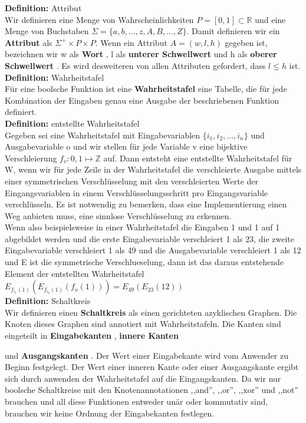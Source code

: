\documentclass{article}
\newenvironment{definition}
    [1]
    {
        {\bf Definition:} #1\\
    }
    {}
\newcommand{\defined}
    [1]
    {
        {\bf #1}
    }
\begin{document}
\begin{definition}{Attribut}
Wir definieren eine Menge von Wahrscheinlichkeiten 
\(P = [0, 1] \subset \mathbb{R}\) und eine Menge von Buchstaben 
\(\Sigma = \{a, b, \dots, z, A, B, \dots, Z\}\).
Damit definieren wir ein \defined{Attribut} als 
\(\Sigma^+ \times P \times P\). Wenn ein Attribut \(A = (w, l, h)\) gegeben ist,
bezeichnen wir w als \defined{Wort}, l als \defined{unterer Schwellwert} und h
als \defined{oberer Schwellwert}. Es wird desweiteren von allen Attributen
gefordert, dass \(l \leq h\) ist.
\end{definition}\\
\begin{definition}{Wahrheitstafel}
F\"ur eine boolsche Funktion ist eine \defined{Wahrheitstafel} eine Tabelle,
die f\"ur jede Kombination der Eingaben genau eine Ausgabe der beschriebenen
Funktion definiert.
\end{definition}\\
\begin{definition}{entstellte Wahrheitstafel}
Gegeben sei eine Wahrheitstafel mit Eingabevariablen 
\(\{i_1, i_2, \dots, i_n\}\) und Ausgabevariable o und wir 
 stellen f\"ur jede Variable v eine bijektive
 Verschleierung \(f_v : {0, 1} \mapsto \mathbb{Z}\) auf. 
Dann entsteht eine entstellte Wahrheitstafel f\"ur W, wenn
 wir f\"ur jede Zeile in der Wahrheitstafel die verschleierte Ausgabe
 mittels einer symmetrischen Verschl\"usselung mit den 
 verschleierten Werte der Eingangsvariablen in einem 
 Verschl\"usselungsschritt pro Eingangsvariable verschl\"usseln.
Es ist notwendig zu bemerken, dass eine Implementierung
 einen Weg anbieten muss, eine sinnlose Verschl\"usselung
 zu erkennen.\\
Wenn also beispielsweise in einer Wahrheitstafel die Eingaben 
 1 und 1 auf 1 abgebildet werden und die erste Eingabevariable
 verschleiert 1 als 23, die zweite Eingabevariable verschleiert
 1 als 49 und die Ausgabevariable verschleiert 1 als 12 und E
 ist die symmetrische Verschlueselung, dann
 ist das daraus entstehende Element der entstellten Wahrheitstafel
 \(E_{f_{i_1}(1)}(E_{f_{i_2}(1)}(f_o(1))) = E_{49}(E_{23}(12))\)
\end{definition}\\
\begin{definition}{Schaltkreis}
Wir definieren einen \defined{Schaltkreis} als einen gerichteten azyklischen 
 Graphen.
Die Knoten dieses Graphen sind annotiert mit Wahrheitstafeln. 
Die Kanten sind eingeteilt in \defined{Eingabekanten}, \defined{innere Kanten} 
 und \defined{Ausgangskanten}.
Der Wert einer Eingabekante wird vom Anwender zu Beginn festgelegt. 
Der Wert einer inneren Kante oder einer Ausgangskante ergibt sich durch
 anwenden der Wahrheitstafel auf die Eingangskanten. 
Da wir nur boolsche Schaltkreise mit den Knotenannotationen ,,and'',
 ,,or'', ,,xor'' und ,,not'' brauchen und all diese Funktionen entweder
 un\"ar oder kommutativ sind, brauchen wir keine Ordnung der Eingabekanten
 festlegen.
\end{definition}\\
\end{document}

